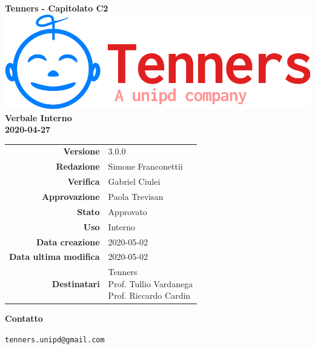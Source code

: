 \begin{titlepage}
	\begin{center}
		\large \textbf{Tenners - Capitolato C2}
		\vfill
		\includegraphics[scale = 0.3]{./res/img/logo.png}\\
		\vfill
		\Huge \textbf{Verbale Interno} \\
		\textbf {2020-04-27}

        \vfill
        \large

        \begin{tabular}{r|l}
                        \textbf{Versione} & 3.0.0 \\
                        \textbf{Redazione} & Simone Franconettii \\
                        \textbf{Verifica} & Gabriel Ciulei\\
                        \textbf{Approvazione} & Paola Trevisan  \\
                        \textbf{Stato} & Approvato \\
                        \textbf{Uso} &  Interno\\
                        \textbf{Data creazione} &  2020-05-02\\
                        \textbf{Data ultima modifica} &  2020-05-02\\
                        \textbf{Destinatari} & \parbox[t]{5cm}{Tenners \\ Prof. Tullio Vardanega\\ Prof. Riccardo Cardin}
                \end{tabular}
                \vfill
                \normalsize
                \vfill
                \textbf{Contatto}

                \texttt{tenners.unipd@gmail.com}

	\end{center}
\end{titlepage}
